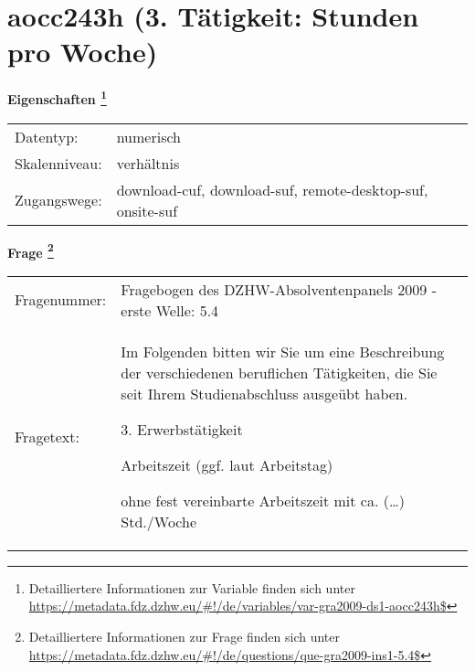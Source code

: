 
    \setcounter{footnote}{0}

    \vspace*{-1.8cm}
	\section{aocc243h (3. Tätigkeit: Stunden pro Woche)}
	\label{section:aocc243h}



    \vspace*{0.5cm}
    \noindent\textbf{Eigenschaften
	\footnote{Detailliertere Informationen zur Variable finden sich unter
		\url{https://metadata.fdz.dzhw.eu/\#!/de/variables/var-gra2009-ds1-aocc243h$}}}\\
	\begin{tabularx}{\hsize}{@{}lX}
	Datentyp: & numerisch \\
	Skalenniveau: & verhältnis \\
	Zugangswege: &
	  download-cuf, 
	  download-suf, 
	  remote-desktop-suf, 
	  onsite-suf
 \\
    \end{tabularx}



				\vspace*{0.5cm}
                \noindent\textbf{Frage
	                \footnote{Detailliertere Informationen zur Frage finden sich unter
		              \url{https://metadata.fdz.dzhw.eu/\#!/de/questions/que-gra2009-ins1-5.4$}}}\\
				\begin{tabularx}{\hsize}{@{}lX}
					Fragenummer: &
					  Fragebogen des DZHW-Absolventenpanels 2009 - erste Welle:
					  5.4
 \\
					Fragetext: & Im Folgenden bitten wir Sie um eine Beschreibung der verschiedenen beruflichen Tätigkeiten, die Sie seit Ihrem Studienabschluss ausgeübt haben.\par  3. Erwerbstätigkeit\par  Arbeitszeit (ggf. laut Arbeitstag)\par  ohne fest vereinbarte Arbeitszeit mit ca. (…) Std./Woche \\
				\end{tabularx}





